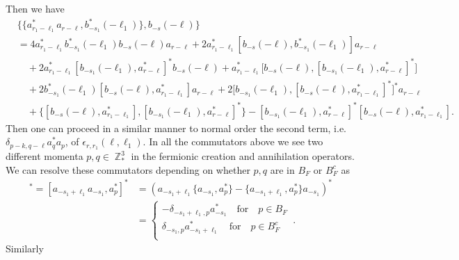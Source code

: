 \documentclass[sn-mathphys, Numbered ,a4paper]{sn-jnl}%
\DeclareMathOperator{\Z}{\mathbb{Z}}
\theoremstyle{plain}
\theoremstyle{definition}
\theoremstyle{remark}
\theoremstyle{plain}
\theoremstyle{definition}
\theoremstyle{remark}
\begin{document}
Then we have
\begin{align}
    &\big\{\{a^*_{r_1-\ell_1}a_{r-\ell}, b^*_{-s_1}(-\ell_1)\},b_{-s}(-\ell)\big\}\nonumber\\
    &= 4a^*_{  r_1-\ell_1}b^*_{-s_1}(-\ell_1)b_{-s}(-\ell)a_{ r-\ell} + 2a^*_{  r_1-\ell_1}[b_{-s}(-\ell),b^*_{-s_1}(-\ell_1)]a_{ r-\ell}\nonumber\\ 
    &\quad + 2a^*_{r_1-\ell_1}[b_{-s_1}(-\ell_1),a^*_{ r-\ell}]^*b_{-s}(-\ell) + a^*_{  r_1-\ell_1}\big[b_{-s}(-\ell),[b_{-s_1}(-\ell_1),a^*_{ r-\ell}]^*\big]\nonumber\\
    &\quad + 2b^*_{-s_1}(-\ell_1)[b_{-s}(-\ell),a^*_{  r_1-\ell_1}]a_{ r-\ell} +2\big[b_{-s_1}(-\ell_1),[b_{-s}(-\ell),a^*_{  r_1-\ell_1}]^*\big]^*a_{ r-\ell}\nonumber\\
    &\quad + \big\{ [b_{-s}(-\ell),a^*_{  r_1-\ell_1}],[b_{-s_1}(-\ell_1), a^*_{ r-\ell}]^* \big\} - [ b_{-s_1}(-\ell_1), a^*_{ r-\ell}]^* [b_{-s}(-\ell), a^*_{r_1-\ell_1}].\label{eq:no2comm}
\end{align}
Then one can proceed in a similar manner to normal order the second term, i.e. $\delta_{p-k,q-\ell}a^*_{q}a_{p}$, of $\epsilon_{r,r_1}(\ell, \ell_1)$. In all the commutators above we see two different momenta $p,q \in \Z^3_*$ in the fermionic creation and annihilation operators. We can resolve these commutators depending on whether $p,q$ are in $B_{F}$ or $B_{F}^c$ as 
\begin{align}
	[b_{-s_1}(-\ell_1), a^*_{p}]^* = [a_{-s_1+\ell_1}a_{-s_1}, a^*_{p}]^* &=\left(a_{-s_1+\ell_1}\{a_{-s_1}, a^*_{p}\}-\{a_{-s_1+\ell_1}, a^*_{p}\}a_{-s_1} \right)^*\nonumber\\ 
	&=\begin{cases}
		-\delta_{-s_1+\ell_1,p}a^*_{-s_1} \quad\text{for}\quad p \in B_F\\
		\delta_{-s_1,p}a^*_{-s_1+\ell_1} \quad\text{for}\quad p \in B^c_F\\
	\end{cases}\label{eq:comm1}\,.
\end{align}
Similarly
\end{document}
